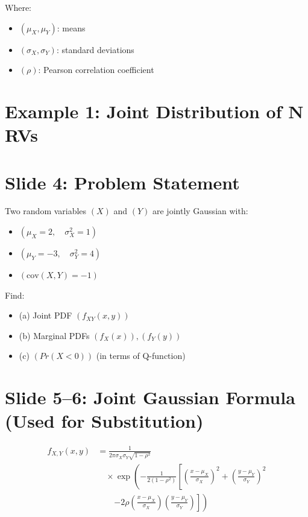 \documentclass[12pt]{article}
\begin{document}
Where:

\begin{itemize}
\item $(\mu_X, \mu_Y)$: means
\item $(\sigma_X, \sigma_Y)$: standard deviations
\item $(\rho)$: Pearson correlation coefficient
\end{itemize}

\section*{Example 1: Joint Distribution of N RVs}

\section*{Slide 4: Problem Statement}

Two random variables $(X)$ and $(Y)$ are jointly Gaussian with:

\begin{itemize}
\item $(\mu_X = 2,\quad \sigma_X^2 = 1)$
\item $(\mu_Y = -3,\quad \sigma_Y^2 = 4)$
\item $(\text{cov}(X,Y) = -1)$
\end{itemize}

Find:

\begin{itemize}
\item (a) Joint PDF $(f_{XY}(x,y))$
\item (b) Marginal PDFs $(f_X(x)), (f_Y(y))$
\item (c) $(Pr(X < 0))$ (in terms of Q-function)
\end{itemize}

\section*{Slide 5–6: Joint Gaussian Formula (Used for Substitution)}

\[
\begin{aligned}
f_{X,Y}(x,y) &=
\frac{1}{2\pi \sigma_X \sigma_Y \sqrt{1-\rho^2}} \\
&\quad \times \exp \left(
-\frac{1}{2(1-\rho^2)}
\left[
\left(\frac{x-\mu_X}{\sigma_X}\right)^2
+
\left(\frac{y-\mu_Y}{\sigma_Y}\right)^2
\right.\right. \\
&\qquad \left.\left.
-2\rho
\left(\frac{x-\mu_X}{\sigma_X}\right)
\left(\frac{y-\mu_Y}{\sigma_Y}\right)
\right]
\right)
\end{aligned}
\]
\end{document}
